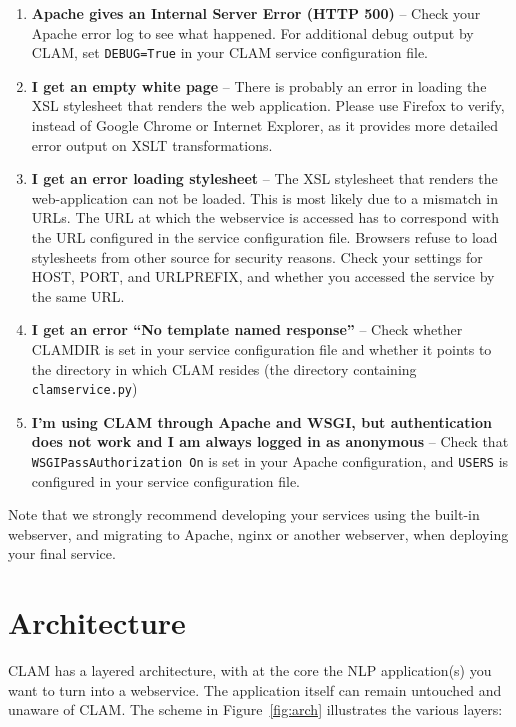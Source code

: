 \documentclass[a4paper,12pt]{report}
\begin{document}
\begin{enumerate}
\item \textbf{Apache gives an Internal Server Error (HTTP 500)} -- Check your Apache error log to see what happened. For additional debug output by CLAM, set \texttt{DEBUG=True} in your CLAM service configuration file. 
\item \textbf{I get an empty white page} -- There is probably an error in loading the XSL stylesheet that renders the web application. Please use Firefox to verify, instead of Google Chrome or Internet Explorer, as it provides more detailed error output on XSLT transformations.
\item \textbf{I get an error loading stylesheet} -- The XSL stylesheet that renders the web-application can not be loaded. This is most likely due to a mismatch in URLs. The URL at which the webservice is accessed has to correspond with the URL configured in the service configuration file. Browsers refuse to load stylesheets from other source for security reasons. Check your settings for HOST, PORT,  and URLPREFIX, and whether you accessed the service by the same URL.
\item \textbf{I get an error ``No template named response''} -- Check whether CLAMDIR is set in your service configuration file and whether it points to the directory in which CLAM resides (the directory containing \texttt{clamservice.py})
\item \textbf{I'm using CLAM through Apache and WSGI, but authentication does not work and I am always logged in as anonymous} -- Check that \texttt{WSGIPassAuthorization On} is set in your Apache configuration, and \texttt{USERS} is configured in your service configuration file.
\end{enumerate}

Note that we strongly recommend developing your services using the built-in
webserver, and migrating to Apache, nginx or another webserver, when deploying
your final service.

\section{Architecture}

CLAM has a layered architecture, with at the core the NLP application(s) you
want to turn into a webservice. The application itself can remain untouched and
unaware of CLAM. The scheme in Figure~\ref{fig:arch} illustrates the various
layers:
\end{document}
